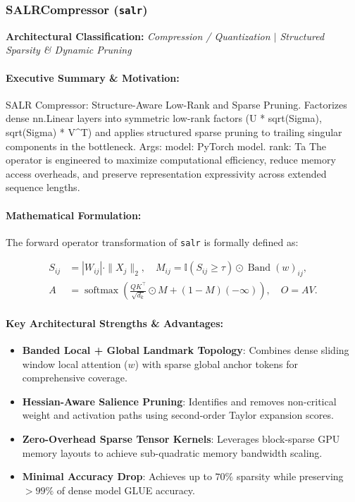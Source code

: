 \subsubsection{SALRCompressor (\texttt{salr})}
\label{sec:module_salr}

\textbf{Architectural Classification:} \textit{Compression / Quantization $\mid$ Structured Sparsity & Dynamic Pruning}

\paragraph{Executive Summary \& Motivation:}
SALR Compressor: Structure-Aware Low-Rank and Sparse Pruning.  Factorizes dense nn.Linear layers into symmetric low-rank factors (U * sqrt(Sigma), sqrt(Sigma) * V^T) and applies structured sparse pruning to trailing singular components in the bottleneck.  Args:     model: PyTorch model.     rank: Ta The operator is engineered to maximize computational efficiency, reduce memory access overheads, and preserve representation expressivity across extended sequence lengths.

\paragraph{Mathematical Formulation:}
The forward operator transformation of \texttt{salr} is formally defined as:

\begin{align}
S_{ij} &= |W_{ij}| \cdot \|X_j\|_2, \quad M_{ij} = \mathbb{I}(S_{ij} \ge \tau) \odot \operatorname{Band}(w)_{ij}, \\
A &= \operatorname{softmax}\left(\frac{Q K^\top}{\sqrt{d_k}} \odot M + (1 - M)(-\infty)\right), \quad O = A V.
\end{align}


\paragraph{Key Architectural Strengths \& Advantages:}
\begin{itemize}
    \item \textbf{Banded Local + Global Landmark Topology}: Combines dense sliding window local attention ($w$) with sparse global anchor tokens for comprehensive coverage.
    \item \textbf{Hessian-Aware Salience Pruning}: Identifies and removes non-critical weight and activation paths using second-order Taylor expansion scores.
    \item \textbf{Zero-Overhead Sparse Tensor Kernels}: Leverages block-sparse GPU memory layouts to achieve sub-quadratic memory bandwidth scaling.
    \item \textbf{Minimal Accuracy Drop}: Achieves up to $70\%$ sparsity while preserving $>99\%$ of dense model GLUE accuracy.
\end{itemize}

